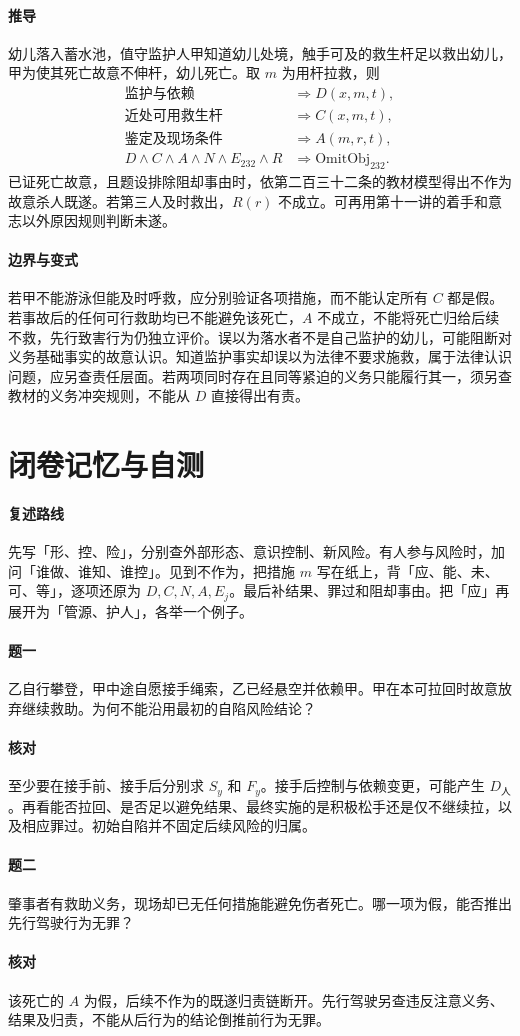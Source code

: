 \paragraph{推导}
幼儿落入蓄水池，值守监护人甲知道幼儿处境，触手可及的救生杆足以救出幼儿，甲为使其死亡故意不伸杆，幼儿死亡。取 $m$ 为用杆拉救，则
\[
\begin{aligned}
\text{监护与依赖}&\Longrightarrow D(x,m,t),\\
\text{近处可用救生杆}&\Longrightarrow C(x,m,t),\\
\text{鉴定及现场条件}&\Longrightarrow A(m,r,t),\\
D\land C\land A\land N\land E_{232}\land R
   &\Longrightarrow\mathrm{OmitObj}_{232}.
\end{aligned}
\]
已证死亡故意，且题设排除阻却事由时，依第二百三十二条的教材模型得出不作为故意杀人既遂。若第三人及时救出，$R(r)$ 不成立。可再用第十一讲的着手和意志以外原因规则判断未遂。

\paragraph{边界与变式}
若甲不能游泳但能及时呼救，应分别验证各项措施，而不能认定所有 $C$ 都是假。若事故后的任何可行救助均已不能避免该死亡，$A$ 不成立，不能将死亡归给后续不救，先行致害行为仍独立评价。误以为落水者不是自己监护的幼儿，可能阻断对义务基础事实的故意认识。知道监护事实却误以为法律不要求施救，属于法律认识问题，应另查责任层面。若两项同时存在且同等紧迫的义务只能履行其一，须另查教材的义务冲突规则，不能从 $D$ 直接得出有责。

\section*{闭卷记忆与自测}

\paragraph{复述路线}
先写「形、控、险」，分别查外部形态、意识控制、新风险。有人参与风险时，加问「谁做、谁知、谁控」。见到不作为，把措施 $m$ 写在纸上，背「应、能、未、可、等」，逐项还原为 $D,C,N,A,E_j$。最后补结果、罪过和阻却事由。把「应」再展开为「管源、护人」，各举一个例子。

\paragraph{题一}
乙自行攀登，甲中途自愿接手绳索，乙已经悬空并依赖甲。甲在本可拉回时故意放弃继续救助。为何不能沿用最初的自陷风险结论？

\paragraph{核对}
至少要在接手前、接手后分别求 $S_y$ 和 $F_y$。接手后控制与依赖变更，可能产生 $D_{\text{人}}$。再看能否拉回、是否足以避免结果、最终实施的是积极松手还是仅不继续拉，以及相应罪过。初始自陷并不固定后续风险的归属。

\paragraph{题二}
肇事者有救助义务，现场却已无任何措施能避免伤者死亡。哪一项为假，能否推出先行驾驶行为无罪？

\paragraph{核对}
该死亡的 $A$ 为假，后续不作为的既遂归责链断开。先行驾驶另查违反注意义务、结果及归责，不能从后行为的结论倒推前行为无罪。
